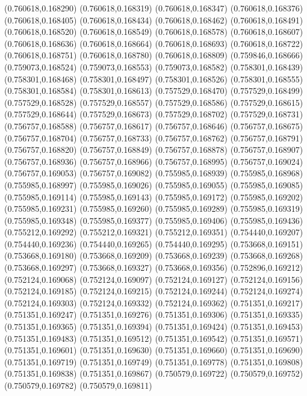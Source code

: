 (0.760618,0.168290)
(0.760618,0.168319)
(0.760618,0.168347)
(0.760618,0.168376)
(0.760618,0.168405)
(0.760618,0.168434)
(0.760618,0.168462)
(0.760618,0.168491)
(0.760618,0.168520)
(0.760618,0.168549)
(0.760618,0.168578)
(0.760618,0.168607)
(0.760618,0.168636)
(0.760618,0.168664)
(0.760618,0.168693)
(0.760618,0.168722)
(0.760618,0.168751)
(0.760618,0.168780)
(0.760618,0.168809)
(0.759846,0.168666)
(0.759073,0.168524)
(0.759073,0.168553)
(0.759073,0.168582)
(0.758301,0.168439)
(0.758301,0.168468)
(0.758301,0.168497)
(0.758301,0.168526)
(0.758301,0.168555)
(0.758301,0.168584)
(0.758301,0.168613)
(0.757529,0.168470)
(0.757529,0.168499)
(0.757529,0.168528)
(0.757529,0.168557)
(0.757529,0.168586)
(0.757529,0.168615)
(0.757529,0.168644)
(0.757529,0.168673)
(0.757529,0.168702)
(0.757529,0.168731)
(0.756757,0.168588)
(0.756757,0.168617)
(0.756757,0.168646)
(0.756757,0.168675)
(0.756757,0.168704)
(0.756757,0.168733)
(0.756757,0.168762)
(0.756757,0.168791)
(0.756757,0.168820)
(0.756757,0.168849)
(0.756757,0.168878)
(0.756757,0.168907)
(0.756757,0.168936)
(0.756757,0.168966)
(0.756757,0.168995)
(0.756757,0.169024)
(0.756757,0.169053)
(0.756757,0.169082)
(0.755985,0.168939)
(0.755985,0.168968)
(0.755985,0.168997)
(0.755985,0.169026)
(0.755985,0.169055)
(0.755985,0.169085)
(0.755985,0.169114)
(0.755985,0.169143)
(0.755985,0.169172)
(0.755985,0.169202)
(0.755985,0.169231)
(0.755985,0.169260)
(0.755985,0.169289)
(0.755985,0.169319)
(0.755985,0.169348)
(0.755985,0.169377)
(0.755985,0.169406)
(0.755985,0.169436)
(0.755212,0.169292)
(0.755212,0.169321)
(0.755212,0.169351)
(0.754440,0.169207)
(0.754440,0.169236)
(0.754440,0.169265)
(0.754440,0.169295)
(0.753668,0.169151)
(0.753668,0.169180)
(0.753668,0.169209)
(0.753668,0.169239)
(0.753668,0.169268)
(0.753668,0.169297)
(0.753668,0.169327)
(0.753668,0.169356)
(0.752896,0.169212)
(0.752124,0.169068)
(0.752124,0.169097)
(0.752124,0.169127)
(0.752124,0.169156)
(0.752124,0.169185)
(0.752124,0.169215)
(0.752124,0.169244)
(0.752124,0.169274)
(0.752124,0.169303)
(0.752124,0.169332)
(0.752124,0.169362)
(0.751351,0.169217)
(0.751351,0.169247)
(0.751351,0.169276)
(0.751351,0.169306)
(0.751351,0.169335)
(0.751351,0.169365)
(0.751351,0.169394)
(0.751351,0.169424)
(0.751351,0.169453)
(0.751351,0.169483)
(0.751351,0.169512)
(0.751351,0.169542)
(0.751351,0.169571)
(0.751351,0.169601)
(0.751351,0.169630)
(0.751351,0.169660)
(0.751351,0.169690)
(0.751351,0.169719)
(0.751351,0.169749)
(0.751351,0.169778)
(0.751351,0.169808)
(0.751351,0.169838)
(0.751351,0.169867)
(0.750579,0.169722)
(0.750579,0.169752)
(0.750579,0.169782)
(0.750579,0.169811)
